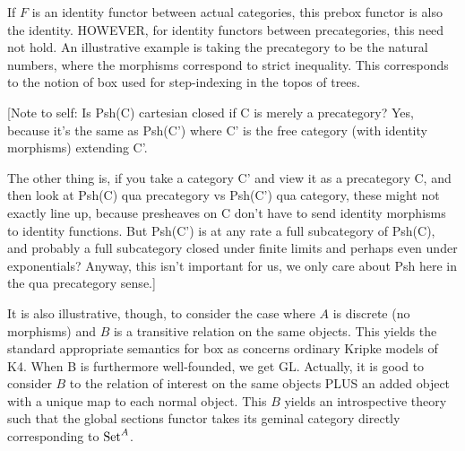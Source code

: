 \begin{TODOblock}
If $F$ is an identity functor between actual categories, this prebox functor is also the identity. HOWEVER, for identity functors between precategories, this need not hold. An illustrative example is taking the precategory to be the natural numbers, where the morphisms correspond to strict inequality. This corresponds to the notion of box used for step-indexing in the topos of trees.

[Note to self: Is Psh(C) cartesian closed if C is merely a precategory? Yes, because it's the same as Psh(C') where C' is the free category (with identity morphisms) extending C'.

The other thing is, if you take a category C' and view it as a precategory C, and then look at Psh(C) qua precategory vs Psh(C') qua category, these might not exactly line up, because presheaves on C don't have to send identity morphisms to identity functions. But Psh(C') is at any rate a full subcategory of Psh(C), and probably a full subcategory closed under finite limits and perhaps even under exponentials? Anyway, this isn't important for us, we only care about Psh here in the qua precategory sense.]

It is also illustrative, though, to consider the case where $A$ is discrete (no morphisms) and $B$ is a transitive relation on the same objects. This yields the standard appropriate semantics for box as concerns ordinary Kripke models of K4. When B is furthermore well-founded, we get GL. Actually, it is good to consider $B$ to the relation of interest on the same objects PLUS an added object with a unique map to each normal object. This $B$ yields an introspective theory such that the global sections functor takes its geminal category directly corresponding to $\mathrm{Set}^A$.
\end{TODOblock}